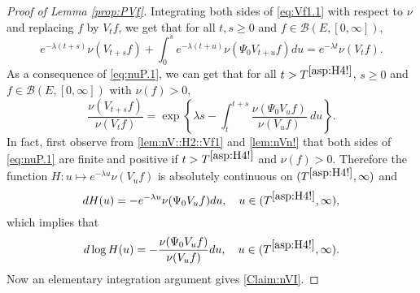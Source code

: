 \documentclass[12pt,a4paper]{amsart}
\numberwithin{equation}{section}
\theoremstyle{plain}
\theoremstyle{definition}
\theoremstyle{remark}
\begin{document}
\begin{proof}[Proof of Lemma \ref{prop:PVf}]
	
	Integrating  both sides of \eqref{eq:Vf1.1} with respect to $\nu$ and replacing $f$ by $V_t f$, we get that for all $t, s\geq 0$ and $f\in \mathcal B(E,[0,\infty])$,
\begin{equation}\label{eq:nuP.1}
	e^{- \lambda (t+s)} \nu(V_{t+s}f) + \int_0^s e^{- \lambda (t+u)} \nu(\Psi_0 V_{t+u}f) du
	= e^{- \lambda t} \nu(V_t f).
\end{equation}
	As a consequence of \eqref{eq:nuP.1}, we can get that for all $t>T^{\eqref{asp:H4!}}$, $s\geq 0$ and $f \in \mathcal B(E,[0,\infty])$ with $\nu(f)>0$,
\begin{equation}\label{Claim:nVI}
	\frac{\nu(V_{t+s} f)} {\nu(V_t f)}
	= \exp\left\{ \lambda s - \int_t^{t+s} \frac{\nu(\Psi_0 V_u f) }{\nu(V_u f)} ~du\right\}.
\end{equation}
	In fact, first observe from \eqref{lem:nV::H2::Vf1} and \eqref{lem:nVn!} that both sides of \eqref{eq:nuP.1} are finite and positive if $t> T^{\eqref{asp:H4!}}$ and $\nu(f)>0$.
	Therefore the function $H: u\mapsto e^{-\lambda u}\nu(V_u f)$ is absolutely continuous on $(T^{\eqref{asp:H4!}},\infty)$ and
\begin{equation}
	d H(u)
	= - e^{- \lambda u} \nu(\Psi_0 V_u f) du,
	\quad u\in (T^{\eqref{asp:H4!}},\infty),
\end{equation}
	which implies that
\begin{equation}
	d \log H(u)
	= - \frac{\nu(\Psi_0 V_u f )}{ \nu(V_u f)} du,
	\quad u \in (T^{\eqref{asp:H4!}},\infty).
\end{equation}
	Now an elementary integration argument gives \eqref{Claim:nVI}.
	

\end{proof}
\end{document}
